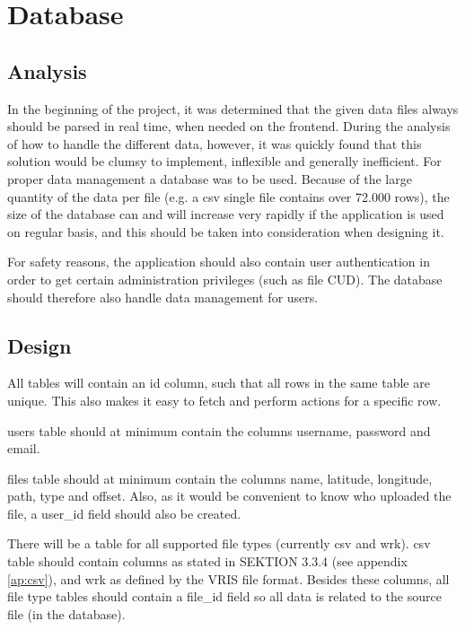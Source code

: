 \section{Database}

\subsection{Analysis}
In the beginning of the project, it was determined that the given data files always should be parsed in real time, when needed on the frontend. During the analysis of how to handle the different data, however, it was quickly found that this solution would be clumsy to implement, inflexible and generally inefficient.
For proper data management a database was to be used. Because of the large quantity of the data per file (e.g. a csv single file contains over 72.000 rows), the size of the database can and will increase very rapidly if the application is used on regular basis, and this should be taken into consideration when designing it.

For safety reasons, the application should also contain user authentication in order to get certain administration privileges (such as file CUD). The database should therefore also handle data management for users.

\subsection{Design}
All tables will contain an \textsf{id} column, such that all rows in the same table are unique. This also makes it easy to fetch and perform actions for a specific row.

\textsf{users} table should at minimum contain the columns \textsf{username, password} and \textsf{email}.

\textsf{files} table should at minimum contain the columns \textsf{name, latitude, longitude, path, type} and \textsf{offset}.
Also, as it would be convenient to know who uploaded the file, a \textsf{user\_id} field should also be created.

There will be a table for all supported file types (currently \textsf{csv} and \textsf{wrk}). \textsf{csv} table should contain columns as stated in SEKTION 3.3.4 (see appendix \ref{ap:csv}), and \textsf{wrk} as defined by the VRIS file format. Besides these columns, all file type tables should contain a \textsf{file\_id} field so all data is related to the source file (in the database).

